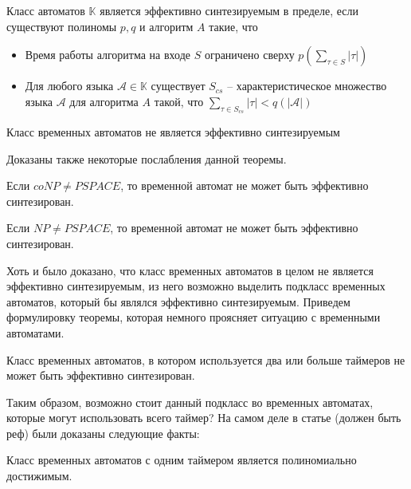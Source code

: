 \documentclass[times,specification,annotation]{itmo-student-thesis}
\begin{document}
\begin{definition}
    Класс автоматов $\mathbb{K}$ является эффективно синтезируемым в пределе, если существуют полиномы $p, q$ и алгоритм $A$ такие, что
  \begin{itemize}
    \item Время работы алгоритма на входе $S$ ограничено сверху $p(\mathop{\sum}\limits_{\tau \in S}|\tau|)$
    \item Для любого языка $\mathcal{A} \in \mathbb{K}$ существует $S_{cs} $ -- характеристическое множество языка $\mathcal{A}$ для алгоритма $A$ такой, что $\mathop{\sum}\limits_{\tau \in S_{cs}}|\tau| < q(|\mathcal{A}|)$
  \end{itemize}
\end{definition}

\begin{theorem}
    Класс временных автоматов не является эффективно синтезируемым
  \label{efficient_synthesis_theorem}
\end{theorem}

Доказаны также некоторые послабления данной теоремы.

\begin{theorem}
  Если $coNP \neq PSPACE$, то временной автомат не может быть эффективно синтезирован.
  \label{coNPneqPSPACE_lemma}
\end{theorem}

\begin{theorem}
  Если $NP \neq PSPACE$, то временной автомат не может быть эффективно синтезирован.
  \label{NPneqPSPACE_lemma}
\end{theorem}

Хоть и было доказано, что класс временных автоматов в целом не является эффективно синтезируемым, из него возможно выделить подкласс временных автоматов, который бы являлся эффективно синтезируемым.
Приведем формулировку теоремы, которая немного проясняет ситуацию с временными автоматами.

\begin{theorem}
  Класс временных автоматов, в котором используется два или больше таймеров не может быть эффективно синтезирован.
  \label{two_or_more_timers_lemma}
\end{theorem}

Таким образом, возможно стоит данный подкласс во временных автоматах, которые могут использовать всего таймер? 
На самом деле в статье (должен быть реф) были доказаны следующие факты:

\begin{lemma}
  Класс временных автоматов с одним таймером является полиномиально достижимым.
  \label{reachability_1_lemma}
\end{lemma}
\end{document}
